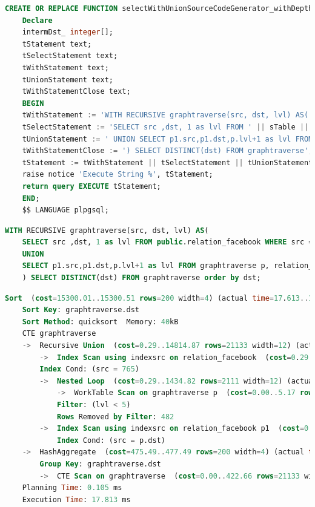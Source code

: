 \begin{lstlisting}[language=SQL,caption = SQL Standard Generisch,frame=single, label={StandardSQLGenerisch} ]
    CREATE OR REPLACE FUNCTION selectWithUnionSourceCodeGenerator_withDepth(sTable text, startingNode integer, depth integer ) RETURNS SETOF integer AS $$
    Declare
    intermDst_ integer[];
    tStatement text;
    tSelectStatement text;
    tWithStatement text;
    tUnionStatement text;
    tWithStatementClose text;
    BEGIN
    tWithStatement := 'WITH RECURSIVE graphtraverse(src, dst, lvl) AS(';
    tSelectStatement := 'SELECT src ,dst, 1 as lvl FROM ' || sTable || ' WHERE src ='||startingNode;
    tUnionStatement := ' UNION SELECT p1.src,p1.dst,p.lvl+1 as lvl FROM graphtraverse p, ' || sTable || ' p1 WHERE p1.src IN ( p.dst ) and lvl<'||depth;
    tWithStatementClose := ') SELECT DISTINCT(dst) FROM graphtraverse';
    tStatement := tWithStatement || tSelectStatement || tUnionStatement || tWithStatementClose;
    raise notice 'Execute String %', tStatement;
    return query EXECUTE tStatement;
    END;
    $$ LANGUAGE plpgsql;
\end{lstlisting}

\begin{lstlisting}[language=SQL,caption = SQL Standard,frame=single, label={StandardSQL} ]
    WITH RECURSIVE graphtraverse(src, dst, lvl) AS(
    SELECT src ,dst, 1 as lvl FROM public.relation_facebook WHERE src =765
    UNION
    SELECT p1.src,p1.dst,p.lvl+1 as lvl FROM graphtraverse p, relation_facebook p1 WHERE p1.src IN ( p.dst ) and lvl<5
    ) SELECT DISTINCT(dst) FROM graphtraverse order by dst;
\end{lstlisting}

\begin{lstlisting}[language=SQL,caption = Ausführungsplan Standard SQL,frame=single, label={AusführungsplanCTEFacebook} ]
    Sort  (cost=15300.01..15300.51 rows=200 width=4) (actual time=17.613..17.622 rows=321 loops=1)
    Sort Key: graphtraverse.dst
    Sort Method: quicksort  Memory: 40kB
    CTE graphtraverse
    ->  Recursive Union  (cost=0.29..14814.87 rows=21133 width=12) (actual time=0.016..15.903 rows=6056 loops=1)
        ->  Index Scan using indexsrc on relation_facebook  (cost=0.29..44.00 rows=23 width=12) (actual time=0.015..0.020 rows=27 loops=1)
        Index Cond: (src = 765)
        ->  Nested Loop  (cost=0.29..1434.82 rows=2111 width=12) (actual time=0.019..2.130 rows=8173 loops=5)
            ->  WorkTable Scan on graphtraverse p  (cost=0.00..5.17 rows=77 width=8) (actual time=0.017..0.069 rows=729 loops=5)
            Filter: (lvl < 5)
            Rows Removed by Filter: 482
        ->  Index Scan using indexsrc on relation_facebook p1  (cost=0.29..18.23 rows=27 width=8) (actual time=0.001..0.002 rows=11 loops=3645)
            Index Cond: (src = p.dst)
    ->  HashAggregate  (cost=475.49..477.49 rows=200 width=4) (actual time=17.548..17.571 rows=321 loops=1)
        Group Key: graphtraverse.dst
        ->  CTE Scan on graphtraverse  (cost=0.00..422.66 rows=21133 width=4) (actual time=0.017..16.771 rows=6056 loops=1)
    Planning Time: 0.105 ms
    Execution Time: 17.813 ms
\end{lstlisting}

